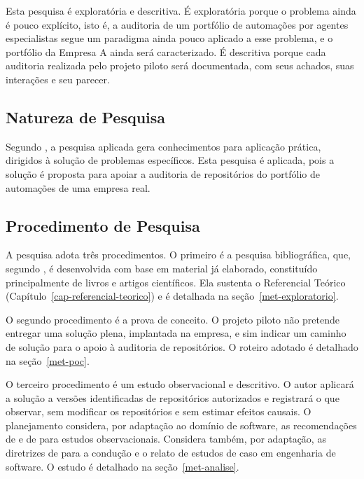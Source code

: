 Esta pesquisa é exploratória e descritiva. É exploratória porque o problema ainda é pouco explícito, isto é, a auditoria de um portfólio de automações por agentes especialistas segue um paradigma ainda pouco aplicado a esse problema, e o portfólio da Empresa A ainda será caracterizado. É descritiva porque cada auditoria realizada pelo projeto piloto será documentada, com seus achados, suas interações e seu parecer.

\subsection{Natureza de Pesquisa}
\label{met-natureza}

Segundo , a pesquisa aplicada gera conhecimentos para aplicação prática, dirigidos à solução de problemas específicos. Esta pesquisa é aplicada, pois a solução é proposta para apoiar a auditoria de repositórios do portfólio de automações de uma empresa real.

\subsection{Procedimento de Pesquisa}
\label{met-procedimento}

A pesquisa adota três procedimentos. O primeiro é a pesquisa bibliográfica, que, segundo , é desenvolvida com base em material já elaborado, constituído principalmente de livros e artigos científicos. Ela sustenta o Referencial Teórico (Capítulo~\ref{cap-referencial-teorico}) e é detalhada na seção~\ref{met-exploratorio}.

O segundo procedimento é a prova de conceito. O projeto piloto não pretende entregar uma solução plena, implantada na empresa, e sim indicar um caminho de solução para o apoio à auditoria de repositórios. O roteiro adotado é detalhado na seção~\ref{met-poc}.

O terceiro procedimento é um estudo observacional e descritivo. O autor aplicará a solução a versões identificadas de repositórios autorizados e registrará o que observar, sem modificar os repositórios e sem estimar efeitos causais. O planejamento considera, por adaptação ao domínio de software, as recomendações de  e de  para estudos observacionais. Considera também, por adaptação, as diretrizes de  para a condução e o relato de estudos de caso em engenharia de software. O estudo é detalhado na seção~\ref{met-analise}.

